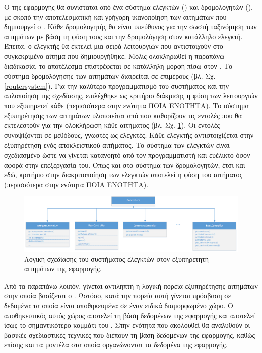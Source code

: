 Ο  της εφαρμογής θα συνίσταται από ένα σύστημα ελεγκτών () και δρομολογητών (), με σκοπό την αποτελεσματική και γρήγορη ικανοποίηση των αιτημάτων που δημιουργεί ο . Κάθε δρομολογητής θα είναι υπεύθυνος για την σωστή ταξινόμηση των αιτημάτων με βάση τη φύση τους και την δρομολόγηση στον κατάλληλο ελεγκτή. Έπειτα, ο ελεγκτής θα εκτελεί μια σειρά λειτουργιών που αντιστοιχούν στο συγκεκριμένο αίτημα που δημιουργήθηκε. Μόλις ολοκληρωθεί η παραπάνω διαδικασία, το αποτέλεσμα επιστρέφεται σε κατάλληλη μορφή πίσω στον .
\newline
\indent
Το σύστημα δρομολόγησης των αιτημάτων διαιρείται σε επιμέρους  (βλ. Σχ. \ref{routersystem}). Για την καλύτερο προγραμματισμό του συστήματος και την απλοποίηση της σχεδίασης, επιλέχθηκε ως κριτήριο διάκρισης η φύση των λειτουργιών που εξυπηρετεί κάθε  (περισσότερα στην ενότητα ΠΟΙΑ ΕΝΟΤΗΤΑ).
\newline
\indent
Το σύστημα εξυπηρέτησης των αιτημάτων υλοποιείται από  που καθορίζουν τις εντολές που θα εκτελεστούν για την ολοκλήρωση κάθε αιτήματος (βλ. Σχ. \ref{controllersystem}). Οι εντολές συνοψίζονται σε μεθόδους, γνωστές ως ελεγκτές. Κάθε ελεγκτής αντιστοιχίζεται στην εξυπηρέτηση ενός αποκλειστικού αιτήματος. Το σύστημα των ελεγκτών είναι σχεδιασμένο ώστε να γίνεται κατανοητό από τον προγραμματιστή και ευέλικτο όσον αφορά στην επεξεργασία του. Όπως και στο σύστημα των δρομολογητών, έτσι και εδώ, κριτήριο στην διακριτοποίηση των ελεγκτών αποτελεί η φύση του αιτήματος (περισσότερα στην ενότητα ΠΟΙΑ ΕΝΟΤΗΤΑ).

\begin{figure}[H]
    \centering
    \includegraphics[scale=0.4]{figures/controller-system.png}
    \caption{Λογική σχεδίασης του συστήματος ελεγκτών στον εξυπηρετητή αιτημάτων της εφαρμογής.}
    \label{controllersystem}
\end{figure}

Από τα παραπάνω λοιπόν, γίνεται αντιληπτή η λογική πορεία εξυπηρέτησης αιτημάτων στην οποία βασίζεται ο . Ωστόσο, κατά την πορεία αυτή γίνεται πρόσβαση σε δεδομένα τα οποία είναι αποθηκευμένα σε έναν ειδικά διαμορφωμένο χώρο. Ο αποθηκευτικός αυτός χώρος αποτελεί τη βάση δεδομένων της εφαρμογής και αποτελεί ίσως το σημαντικότερο κομμάτι του . Στην ενότητα που ακολουθεί θα αναλυθούν οι βασικές σχεδιαστικές τεχνικές που διέπουν τη βάση δεδομένων  της εφαρμογής, καθώς επίσης και τα μοντέλα στα οποία οργανώνονται τα δεδομένα της εφαρμογής.


